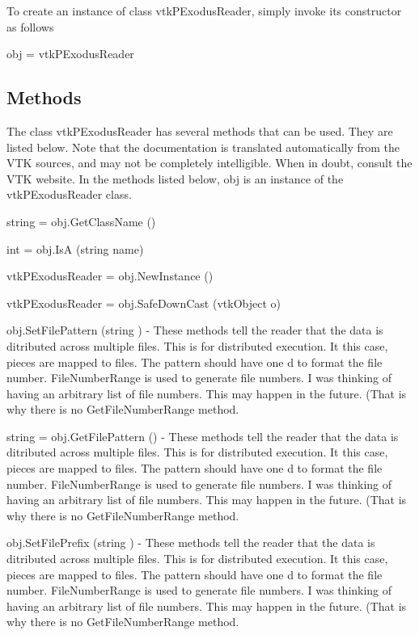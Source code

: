 To create an instance of class vtk\-P\-Exodus\-Reader, simply invoke its constructor as follows \begin{DoxyVerb}  obj = vtkPExodusReader
\end{DoxyVerb}
 \hypertarget{vtkwidgets_vtkxyplotwidget_Methods}{}\subsection{Methods}\label{vtkwidgets_vtkxyplotwidget_Methods}
The class vtk\-P\-Exodus\-Reader has several methods that can be used. They are listed below. Note that the documentation is translated automatically from the V\-T\-K sources, and may not be completely intelligible. When in doubt, consult the V\-T\-K website. In the methods listed below, {\ttfamily obj} is an instance of the vtk\-P\-Exodus\-Reader class. 
\begin{DoxyItemize}
\item {\ttfamily string = obj.\-Get\-Class\-Name ()}  
\item {\ttfamily int = obj.\-Is\-A (string name)}  
\item {\ttfamily vtk\-P\-Exodus\-Reader = obj.\-New\-Instance ()}  
\item {\ttfamily vtk\-P\-Exodus\-Reader = obj.\-Safe\-Down\-Cast (vtk\-Object o)}  
\item {\ttfamily obj.\-Set\-File\-Pattern (string )} -\/ These methods tell the reader that the data is ditributed across multiple files. This is for distributed execution. It this case, pieces are mapped to files. The pattern should have one d to format the file number. File\-Number\-Range is used to generate file numbers. I was thinking of having an arbitrary list of file numbers. This may happen in the future. (That is why there is no Get\-File\-Number\-Range method.  
\item {\ttfamily string = obj.\-Get\-File\-Pattern ()} -\/ These methods tell the reader that the data is ditributed across multiple files. This is for distributed execution. It this case, pieces are mapped to files. The pattern should have one d to format the file number. File\-Number\-Range is used to generate file numbers. I was thinking of having an arbitrary list of file numbers. This may happen in the future. (That is why there is no Get\-File\-Number\-Range method.  
\item {\ttfamily obj.\-Set\-File\-Prefix (string )} -\/ These methods tell the reader that the data is ditributed across multiple files. This is for distributed execution. It this case, pieces are mapped to files. The pattern should have one d to format the file number. File\-Number\-Range is used to generate file numbers. I was thinking of having an arbitrary list of file numbers. This may happen in the future. (That is why there is no Get\-File\-Number\-Range method.  

\end{DoxyItemize}
